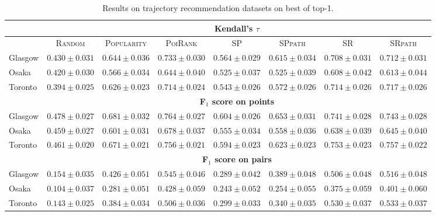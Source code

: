 \begin{table*}[!h]
\caption{Results on trajectory recommendation datasets on best of top-1.}
\centering
\scriptsize
\setlength{\tabcolsep}{3pt} %
\begin{tabular}{l|cc|cc|ccc} \hline
& \multicolumn{7}{c}{\bf Kendall's $\tau$} \\ \hline
 & \textsc{Random} & \textsc{Popularity} & \textsc{PoiRank} & \textsc{SP} & \textsc{SPpath} & \textsc{SR} & \textsc{SRpath} \\ \hline
Glasgow & $0.430\pm0.031$ & $0.644\pm0.036$ & $\mathbf{0.733\pm0.030}$ & $0.564\pm0.029$ & $0.615\pm0.034$ & $0.708\pm0.031$ & $\mathit{0.712\pm0.031}$ \\
Osaka & $0.420\pm0.030$ & $0.566\pm0.034$ & $\mathbf{0.644\pm0.040}$ & $0.525\pm0.037$ & $0.525\pm0.039$ & $0.608\pm0.042$ & $\mathit{0.613\pm0.044}$ \\
Toronto & $0.394\pm0.025$ & $0.626\pm0.023$ & $\mathit{0.714\pm0.024}$ & $0.543\pm0.026$ & $0.572\pm0.026$ & $0.714\pm0.026$ & $\mathbf{0.717\pm0.026}$ \\
\hline
& \multicolumn{7}{c}{\bf F$_1$ score on points} \\ \hline
Glasgow & $0.478\pm0.027$ & $0.681\pm0.032$ & $\mathbf{0.764\pm0.027}$ & $0.604\pm0.026$ & $0.653\pm0.031$ & $0.741\pm0.028$ & $\mathit{0.743\pm0.028}$ \\
Osaka & $0.459\pm0.027$ & $0.601\pm0.031$ & $\mathbf{0.678\pm0.037}$ & $0.555\pm0.034$ & $0.558\pm0.036$ & $0.638\pm0.039$ & $\mathit{0.645\pm0.040}$ \\
Toronto & $0.461\pm0.020$ & $0.671\pm0.021$ & $\mathit{0.756\pm0.021}$ & $0.594\pm0.023$ & $0.623\pm0.023$ & $0.753\pm0.023$ & $\mathbf{0.757\pm0.022}$ \\
\hline
& \multicolumn{7}{c}{\bf F$_1$ score on pairs} \\ \hline
Glasgow & $0.154\pm0.035$ & $0.426\pm0.051$ & $\mathbf{0.545\pm0.046}$ & $0.289\pm0.042$ & $0.389\pm0.048$ & $0.506\pm0.048$ & $\mathit{0.516\pm0.048}$ \\
Osaka & $0.104\pm0.037$ & $0.281\pm0.051$ & $\mathbf{0.428\pm0.059}$ & $0.243\pm0.052$ & $0.254\pm0.055$ & $0.375\pm0.059$ & $\mathit{0.401\pm0.060}$ \\
Toronto & $0.143\pm0.025$ & $0.384\pm0.034$ & $0.506\pm0.036$ & $0.299\pm0.033$ & $0.340\pm0.035$ & $\mathit{0.530\pm0.037}$ & $\mathbf{0.533\pm0.037}$ \\
\hline
\end{tabular}
\end{table*}


